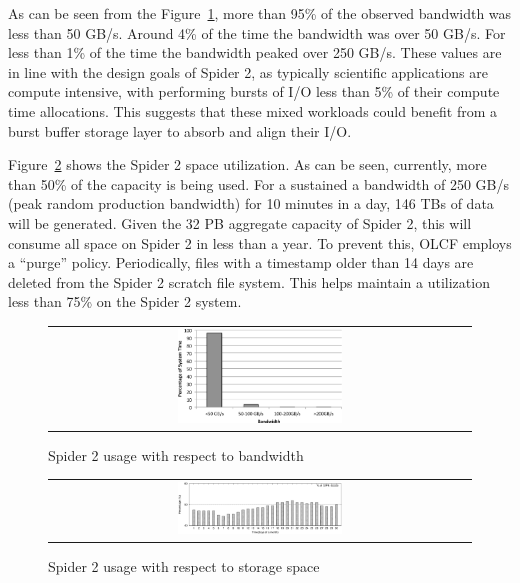 As can be seen from the Figure~\ref{fig:bwUsage}, more than 95\% of the 
observed bandwidth was less than 50 GB/s. Around 4\% of the time the bandwidth
was over 50 GB/s. For less than 1\% of the time the bandwidth peaked over
250 GB/s. These values are in line with the design goals of Spider 2, as
typically scientific applications are compute intensive, with performing bursts
of I/O less than 5\% of their compute time allocations. This suggests that these 
mixed workloads could benefit from a burst buffer storage layer to absorb and align 
their I/O.

Figure~\ref{fig:storageUsage} shows the Spider 2 space utilization. As can be
seen, currently, more than 50\% of the capacity is being used.  For a sustained a
bandwidth of 250 GB/s (peak random production bandwidth) for 10 minutes in a
day, 146 TBs of data will be generated. Given the 32 PB aggregate capacity of
Spider 2, this will consume all space on Spider 2 in less than a year. To
prevent this, OLCF employs a ``purge'' policy. Periodically, files with a
timestamp older than 14 days are deleted from the Spider 2 scratch file system.
This helps maintain a utilization less than 75\% on the Spider 2 system.  

\begin{figure}[!thb]
\begin{center}
\begin{tabular}{c}
{\includegraphics[width=0.40\textwidth]{./figs/bwUsage.eps}}\\
\end{tabular}
\vspace{-0.1in}
\caption{Spider 2 usage with respect to bandwidth}
\label{fig:bwUsage}
\end{center}
\end{figure}



\begin{figure}[!thb]
\begin{center}
\begin{tabular}{c}
{\includegraphics[width=0.40\textwidth]{./figs/storageUsage.eps}}\\
\end{tabular}
\vspace{-0.1in}
\caption{Spider 2 usage with respect to storage space}
\label{fig:storageUsage}
\end{center}
\end{figure}


